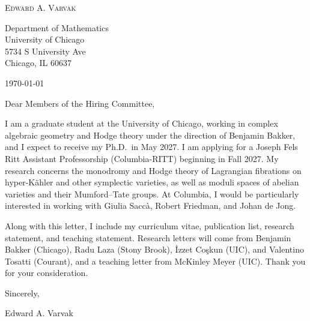 \documentclass[12pt]{article}
\begin{document}
\begin{center}
  {\Large\textsc{Edward A. Varvak}}\\[10pt]
\end{center}

Department of Mathematics \\
University of Chicago \\
5734 S University Ave \\
Chicago, IL 60637

\today

Dear Members of the Hiring Committee,

I am a graduate student at the University of Chicago, working in complex
algebraic geometry and Hodge theory under the direction of Benjamin Bakker,
and I expect to receive my Ph.D.\ in May 2027. I am applying for a Joseph
Fels Ritt Assistant Professorship (\mbox{Columbia-RITT}) beginning in Fall
2027. My research concerns the monodromy and Hodge theory of Lagrangian
fibrations on hyper-K\"ahler and other symplectic varieties, as well as
moduli spaces of abelian varieties and their Mumford--Tate groups. At
Columbia, I would be particularly interested in working with Giulia Sacc\`a,
Robert Friedman, and Johan de Jong.

Along with this letter, I include my curriculum vitae, publication list,
research statement, and teaching statement. Research letters will come from
Benjamin Bakker (Chicago), Radu Laza (Stony Brook), \.{I}zzet Co\c{s}kun
(UIC), and Valentino Tosatti (Courant), and a teaching letter from McKinley
Meyer (UIC). Thank you for your consideration.

Sincerely,

Edward A. Varvak
\end{document}
